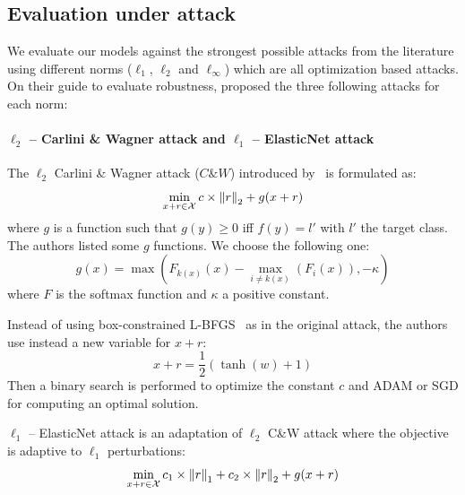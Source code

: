 \subsection{Evaluation under attack}

We evaluate our models against the strongest possible attacks from the literature using different norms ($\ell_1$, $\ell_2$ and $\ell_\infty$) which are all optimization based attacks.
On their guide to evaluate robustness, \citet{carlini2019evaluating} proposed the three following attacks for each norm: 

\paragraph{$\ell_2$ -- Carlini \& Wagner attack and $\ell_1$ -- ElasticNet attack}
The $\ell_2$ Carlini \& Wagner attack ($C\&W$) introduced by~\citet{carlini2017towards} is formulated as:
\begin{equation}
  \min_{x+r\in \mathcal{X} } c \times \norm{r}_2+g(x+r)
\end{equation}
where $g$ is a function such that $g(y)\geq 0$ iff $f(y)=l'$ with $l'$ the target class.
The authors listed some $g$ functions.
We choose the following one:
\begin{equation}
  g(x)=\max(F_{k(x)}(x)-\max_{i\neq k(x)}(F_i(x)),-\kappa)
\end{equation}
where $F$ is the softmax function and $\kappa$ a positive constant.

Instead of using box-constrained L-BFGS~\cite{Szegedy2013IntriguingPO} as in the original attack, the authors use instead a new variable for $x+r$:
\begin{equation}
  x+r=\frac{1}{2} (\tanh(w)+1)
\end{equation}
\medbreak
Then a binary search is performed to optimize the constant $c$ and ADAM or SGD for computing an optimal solution.

$\ell_1$ -- ElasticNet attack is an adaptation of $\ell_2$ C\&W attack where the objective is adaptive to $\ell_1$ perturbations:
\begin{equation}
  \min_{x+r\in \mathcal{X} } c_1\times\norm{r}_1+c_2\times\norm{r}_2+g(x+r)
\end{equation}


